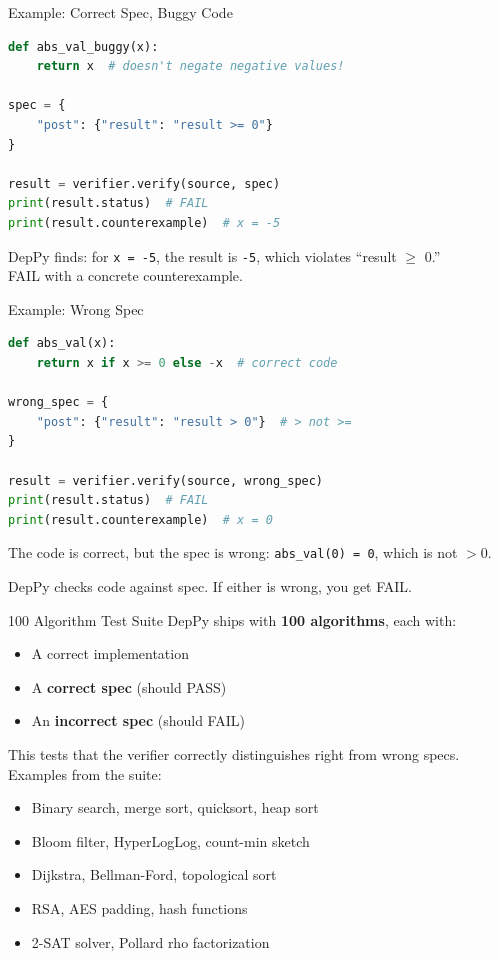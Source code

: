 \documentclass[aspectratio=169,10pt]{beamer}
\newcommand{\hint}[1]{\begin{center}
  \colorbox{hintbg}{\parbox{0.88\textwidth}{\centering\small #1}}\end{center}}
\begin{document}
\begin{frame}[fragile]{Example: Correct Spec, Buggy Code}
\begin{lstlisting}[language=Python, basicstyle=\ttfamily\scriptsize]
def abs_val_buggy(x):
    return x  # doesn't negate negative values!

spec = {
    "post": {"result": "result >= 0"}
}

result = verifier.verify(source, spec)
print(result.status)  # FAIL
print(result.counterexample)  # x = -5
\end{lstlisting}
\vspace{0.3em}
DepPy finds: for \texttt{x = -5}, the result is \texttt{-5}, which violates ``result $\ge$ 0.''\\
\textcolor{danger}{FAIL} with a concrete counterexample.
\end{frame}

\begin{frame}[fragile]{Example: Wrong Spec}
\begin{lstlisting}[language=Python, basicstyle=\ttfamily\scriptsize]
def abs_val(x):
    return x if x >= 0 else -x  # correct code

wrong_spec = {
    "post": {"result": "result > 0"}  # > not >=
}

result = verifier.verify(source, wrong_spec)
print(result.status)  # FAIL
print(result.counterexample)  # x = 0
\end{lstlisting}
\vspace{0.3em}
The code is correct, but the spec is wrong: \texttt{abs\_val(0) = 0}, which is not $> 0$.
\hint{DepPy checks code against spec. If either is wrong, you get FAIL.}
\end{frame}

\begin{frame}{100 Algorithm Test Suite}
DepPy ships with \textbf{100 algorithms}, each with:
\begin{itemize}
  \item A correct implementation
  \item A \textbf{correct spec} (should PASS)
  \item An \textbf{incorrect spec} (should FAIL)
\end{itemize}
\vspace{0.3em}
This tests that the verifier correctly distinguishes right from wrong specs.\\
Examples from the suite:
\begin{itemize}
  \item Binary search, merge sort, quicksort, heap sort
  \item Bloom filter, HyperLogLog, count-min sketch
  \item Dijkstra, Bellman-Ford, topological sort
  \item RSA, AES padding, hash functions
  \item 2-SAT solver, Pollard rho factorization
\end{itemize}
\end{frame}
\end{document}
